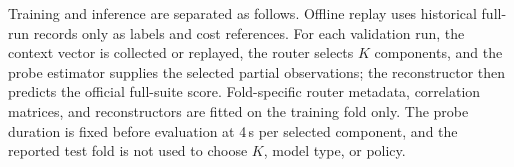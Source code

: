 \documentclass[sigplan,10pt]{acmart}
\newcommand{\ourmethod}{\textsc{BenchScout}\xspace}
\newcommand{\ptscpu}{PTS-CPU}
\newcommand{\ptsgpu}{PTS-GPU}
\newcommand{\appname}{BenchScout}
\begin{document}
Training and inference are separated as follows.  Offline replay uses historical
full-run records only as labels and cost references.  For each validation run, the
context vector is collected or replayed, the router selects \(K\) components, and
the probe estimator supplies the selected partial observations; the reconstructor
then predicts the official full-suite score.  Fold-specific router metadata,
correlation matrices, and reconstructors are fitted on the training fold only.
The probe duration is fixed before evaluation at 4\,s per selected component, and
the reported test fold is not used to choose \(K\), model type, or policy.





\end{document}
